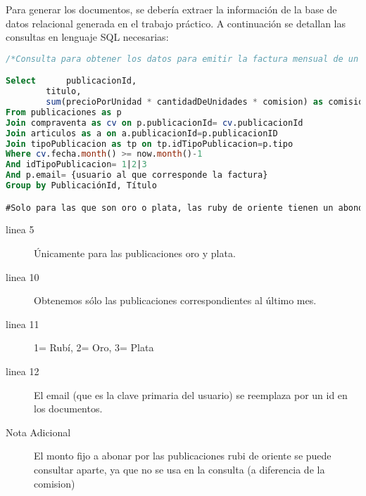 Para generar los documentos, se debería extraer la información de la base de datos relacional generada en el trabajo práctico.
A continuación se detallan las consultas en lenguaje SQL necesarias:

  \begin{lstlisting}[language=SQL]
/*Consulta para obtener los datos para emitir la factura mensual de un usuario*/

Select		publicacionId,
		titulo,
		sum(precioPorUnidad * cantidadDeUnidades * comision) as comision
From publicaciones as p 
Join compraventa as cv on p.publicacionId= cv.publicacionId 
Join articulos as a on a.publicacionId=p.publicacionID
Join tipoPublicacion as tp on tp.idTipoPublicacion=p.tipo 
Where cv.fecha.month() >= now.month()-1 
And idTipoPublicacion= 1|2|3 
And p.email= {usuario al que corresponde la factura} 
Group by PublicaciónId, Título

#Solo para las que son oro o plata, las ruby de oriente tienen un abono fijo

  \end{lstlisting}
  \begin{description}
 \item[linea 5] Únicamente para las publicaciones oro y plata.
 \item[linea 10] Obtenemos sólo las publicaciones correspondientes al último mes.
 \item[linea 11] 1= Rubí, 2= Oro, 3= Plata
 \item[linea 12] El email (que es la clave primaria del usuario) se reemplaza por un id en los documentos.
 \item[Nota Adicional] El monto fijo a abonar por las publicaciones rubi de oriente se puede consultar aparte, ya que
 no se usa en la consulta (a diferencia de la comision)
  \end{description}

